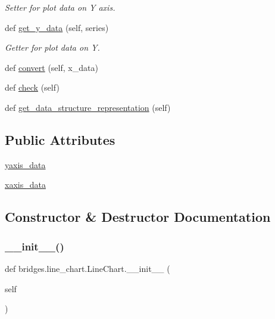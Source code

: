 \begin{DoxyCompactItemize}
\begin{DoxyCompactList}\small\item\em Setter for plot data on Y axis. \end{DoxyCompactList}\item 
def \hyperlink{classbridges_1_1line__chart_1_1_line_chart_ad598554c70b1524eb900b4a66635e367}{get\+\_\+y\+\_\+data} (self, series)
\begin{DoxyCompactList}\small\item\em Getter for plot data on Y. \end{DoxyCompactList}\item 
def \hyperlink{classbridges_1_1line__chart_1_1_line_chart_ab9d76afae32e71d0a640ac26b13e645c}{convert} (self, x\+\_\+data)
\item 
def \hyperlink{classbridges_1_1line__chart_1_1_line_chart_a4d331f4d5906f70b09efd11728d703a7}{check} (self)
\item 
def \hyperlink{classbridges_1_1line__chart_1_1_line_chart_a51cb18ae6ebe1fa514de14b8006cc238}{get\+\_\+data\+\_\+structure\+\_\+representation} (self)
\end{DoxyCompactItemize}
\subsection*{Public Attributes}
\begin{DoxyCompactItemize}
\item 
\hyperlink{classbridges_1_1line__chart_1_1_line_chart_ae32afdcdfe6398ef247f9431de603495}{yaxis\+\_\+data}
\item 
\hyperlink{classbridges_1_1line__chart_1_1_line_chart_a13a52ecfbe82477fd6203aaa7569c1c7}{xaxis\+\_\+data}
\end{DoxyCompactItemize}


\subsection{Constructor \& Destructor Documentation}
\mbox{\label{classbridges_1_1line__chart_1_1_line_chart_a20c96d892b92624aa367710c9b4386fa}} 
\subsubsection{\texorpdfstring{\+\_\+\+\_\+init\+\_\+\+\_\+()}{\_\_init\_\_()}}
{\footnotesize\ttfamily def bridges.\+line\+\_\+chart.\+Line\+Chart.\+\_\+\+\_\+init\+\_\+\+\_\+ (\begin{DoxyParamCaption}\item[{}]{self }\end{DoxyParamCaption})}



